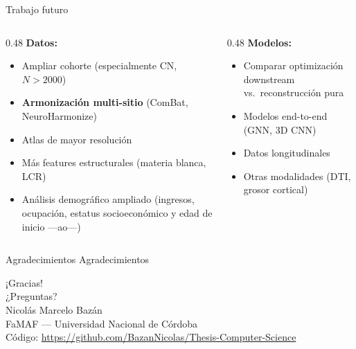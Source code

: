 \documentclass[aspectratio=169, 11pt]{beamer}
\begin{document}
\begin{frame}{Trabajo futuro}
  \begin{columns}[T]
    \begin{column}{0.48\textwidth}
      \textbf{Datos:}
      \begin{itemize}
        \item Ampliar cohorte (especialmente CN, $N > 2000$)
        \item \textbf{Armonización multi-sitio} (ComBat, NeuroHarmonize)
        \item Atlas de mayor resolución
        \item Más features estructurales (materia blanca, LCR)
        \item Análisis demográfico ampliado (ingresos, ocupación, estatus socioeconómico y edad de inicio ---ao---)
      \end{itemize}
    \end{column}
    \begin{column}{0.48\textwidth}
      \textbf{Modelos:}
      \begin{itemize}
        \item Comparar optimización downstream vs.\ reconstrucción pura
        \item Modelos end-to-end (GNN, 3D CNN)
        \item Datos longitudinales
        \item Otras modalidades (DTI, grosor cortical)
      \end{itemize}
    \end{column}
  \end{columns}
\end{frame}

\begin{frame}{Agradecimientos}
  \vspace{2.5cm}
  \centering
  {\large Agradecimientos}
\end{frame}

\begin{frame}{}
  \vspace{2cm}
  \centering
  {\Huge \textcolor{uncblue}{¡Gracias!}}\\[1cm]
  {\Large ¿Preguntas?}\\[1.2cm]
  {\small
    Nicolás Marcelo Bazán\\
    FaMAF --- Universidad Nacional de Córdoba\\[0.35cm]
    Código: \url{https://github.com/BazanNicolas/Thesis-Computer-Science}
  }
\end{frame}
\end{document}
